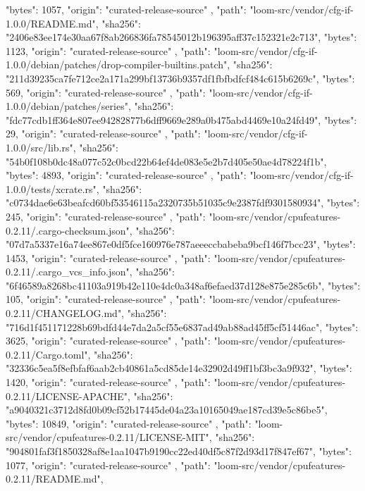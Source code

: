 {{      "bytes": 1057,
      "origin": "curated-release-source"
    },
    {
      "path": "loom-src/vendor/cfg-if-1.0.0/README.md",
      "sha256": "2406e83ee174e30aa67f8ab266836fa78545012b196395aff37c152321e2c713",
      "bytes": 1123,
      "origin": "curated-release-source"
    },
    {
      "path": "loom-src/vendor/cfg-if-1.0.0/debian/patches/drop-compiler-builtins.patch",
      "sha256": "211d39235ca7fe712ce2a171a299bf13736b9357df1fbfbdfcf484c615b6269c",
      "bytes": 569,
      "origin": "curated-release-source"
    },
    {
      "path": "loom-src/vendor/cfg-if-1.0.0/debian/patches/series",
      "sha256": "fdc77cdb1ff364e807ee94282877b6dff9669e289a0b475abd4469e10a24fd49",
      "bytes": 29,
      "origin": "curated-release-source"
    },
    {
      "path": "loom-src/vendor/cfg-if-1.0.0/src/lib.rs",
      "sha256": "54b0f108b0dc48a077c52c0bcd22b64ef4de083e5e2b7d405e50ae4d78224f1b",
      "bytes": 4893,
      "origin": "curated-release-source"
    },
    {
      "path": "loom-src/vendor/cfg-if-1.0.0/tests/xcrate.rs",
      "sha256": "c0734dae6e63beafcd60bf53546115a2320735b51035c9e2387fdf9301580934",
      "bytes": 245,
      "origin": "curated-release-source"
    },
    {
      "path": "loom-src/vendor/cpufeatures-0.2.11/.cargo-checksum.json",
      "sha256": "07d7a5337e16a74ee867e0df5fce160976e787aeeeccbabeba9bcf146f7bcc23",
      "bytes": 1453,
      "origin": "curated-release-source"
    },
    {
      "path": "loom-src/vendor/cpufeatures-0.2.11/.cargo_vcs_info.json",
      "sha256": "6f46589a8268bc41103a919b42e110e4dc0a348af6efaed37d128e875e285c6b",
      "bytes": 105,
      "origin": "curated-release-source"
    },
    {
      "path": "loom-src/vendor/cpufeatures-0.2.11/CHANGELOG.md",
      "sha256": "716d1f451171228b69bdfd44e7da2a5cf55e6837ad49ab88ad45ff5cf51446ac",
      "bytes": 3625,
      "origin": "curated-release-source"
    },
    {
      "path": "loom-src/vendor/cpufeatures-0.2.11/Cargo.toml",
      "sha256": "32336c5ea5f8efbfaf6aab2cb40861a5cd85de14e32902d49ff1bf3bc3a9f932",
      "bytes": 1420,
      "origin": "curated-release-source"
    },
    {
      "path": "loom-src/vendor/cpufeatures-0.2.11/LICENSE-APACHE",
      "sha256": "a9040321c3712d8fd0b09cf52b17445de04a23a10165049ae187cd39e5c86be5",
      "bytes": 10849,
      "origin": "curated-release-source"
    },
    {
      "path": "loom-src/vendor/cpufeatures-0.2.11/LICENSE-MIT",
      "sha256": "904801faf3f1850328af8e1aa1047b9190cc22ed40df5c87f2d93d17f847ef67",
      "bytes": 1077,
      "origin": "curated-release-source"
    },
    {
      "path": "loom-src/vendor/cpufeatures-0.2.11/README.md",
}}
